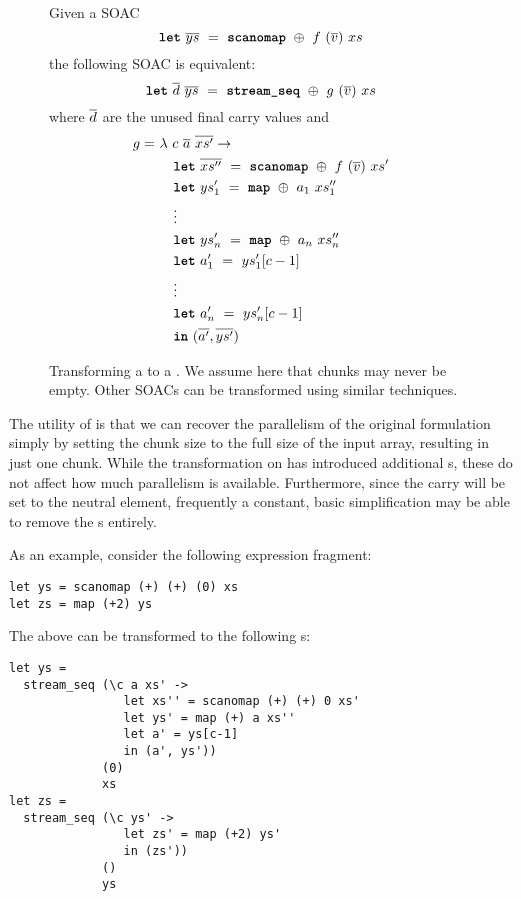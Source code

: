 \begin{figure}[bt]
Given a SOAC
\[
  \mbox{\texttt{\bfseries{let}}}~\overline{ys}~=~\mbox{\texttt{\bfseries{scanomap}}}~\oplus~f~(\overline{v})~xs
\]
the following SOAC is equivalent:
\[
  \mbox{\texttt{\bfseries{let}}}~\overline{d}~\overline{ys}~=~\mbox{\texttt{\bfseries{stream\_seq}}}~\oplus~g~(\overline{v})~xs
\]
where $\overline{d}$ are the unused final carry values and
  \begin{align*}
    g =~& \lambda~c~\overline{a}~\overline{xs'} \rightarrow \\
        & \quad \mbox{\texttt{\bfseries{let}}}~\overline{xs''}~=~\mbox{\texttt{\bfseries{scanomap}}}~\oplus~f~(\overline{v})~xs' \\
        & \quad \mbox{\texttt{\bfseries{let}}}~ys'_{1}~=~\mbox{\texttt{\bfseries{map}}}~\oplus~a_{1}~xs''_{1} \\
        & \quad \vdots \\
        & \quad \mbox{\texttt{\bfseries{let}}}~ys'_{n}~=~\mbox{\texttt{\bfseries{map}}}~\oplus~a_{n}~xs''_{n} \\
        & \quad \mbox{\texttt{\bfseries{let}}}~a'_{1}~=~ys'_{1}[c-1] \\
        & \quad \vdots \\
        & \quad \mbox{\texttt{\bfseries{let}}}~a'_{n}~=~ys'_{n}[c-1] \\
        & \quad \mbox{\texttt{\bfseries{in}}}~(\overline{a'},\overline{ys'}) \\
  \end{align*}
  \caption{Transforming a  to a .  We
    assume here that chunks may never be empty.  Other SOACs can be
    transformed using similar techniques.}
  \label{fig:scanomap-to-streamseq}
\end{figure}

The utility of \StreamSeq is that we can recover the parallelism of
the original formulation simply by setting the chunk size to the full
size of the input array, resulting in just one chunk.  While the
transformation on  has introduced
additional s, these do not affect how much parallelism is
available.  Furthermore, since the carry will be set to the neutral
element, frequently a constant, basic simplification may be able to
remove the s entirely.

As an example, consider the following expression fragment:

\begin{lstlisting}
let ys = scanomap (+) (+) (0) xs
let zs = map (+2) ys
\end{lstlisting}

The above can be transformed to the following \StreamSeq{}s:

\begin{lstlisting}
let ys =
  stream_seq (\c a xs' ->
                let xs'' = scanomap (+) (+) 0 xs'
                let ys' = map (+) a xs''
                let a' = ys[c-1]
                in (a', ys'))
             (0)
             xs
let zs =
  stream_seq (\c ys' ->
                let zs' = map (+2) ys'
                in (zs'))
             ()
             ys
\end{lstlisting}

